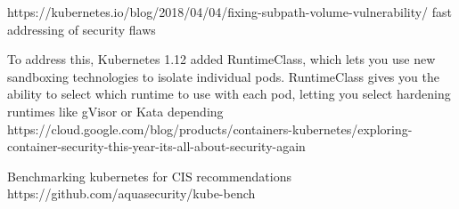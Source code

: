 https://kubernetes.io/blog/2018/04/04/fixing-subpath-volume-vulnerability/
fast addressing of security flaws

To address this, Kubernetes 1.12 added RuntimeClass, which lets you use new sandboxing technologies to isolate individual pods. RuntimeClass gives you the ability to select which runtime to use with each pod, letting you select hardening runtimes like gVisor or Kata depending
https://cloud.google.com/blog/products/containers-kubernetes/exploring-container-security-this-year-its-all-about-security-again

Benchmarking kubernetes for CIS recommendations
https://github.com/aquasecurity/kube-bench